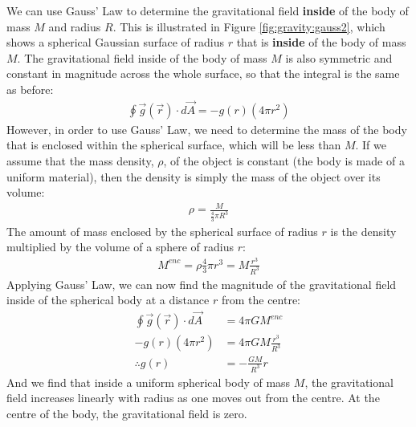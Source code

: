 We can use Gauss' Law to determine the gravitational field \textbf{inside} of the body of mass $M$ and radius $R$. This is illustrated in Figure \ref{fig:gravity:gauss2}, which shows a spherical Gaussian surface of radius $r$ that is \textbf{inside} of the body of mass $M$.
The gravitational field inside of the body of mass $M$ is also symmetric and constant in magnitude across the whole surface, so that the integral is the same as before:
\begin{align*}
\oint \vec g(\vec r) \cdot d\vec A=-g(r)(4\pi r^2)
\end{align*}
However, in order to use Gauss' Law, we need to determine the mass of the body that is enclosed within the spherical surface, which will be less than $M$. If we assume that the mass density, $\rho$, of the object is constant (the body is made of a uniform material), then the density is simply the mass of the object over its volume:
\begin{align*}
\rho = \frac{M}{\frac{4}{3}\pi R^3}
\end{align*}
The amount of mass enclosed by the spherical surface of radius $r$ is the density multiplied by the volume of a sphere of radius $r$:
\begin{align*}
M^{enc} = \rho \frac{4}{3}\pi r^3 = M\frac{r^3}{R^3}
\end{align*}
Applying Gauss' Law, we can now find the magnitude of the gravitational field inside of the spherical body at a distance $r$ from the centre:
\begin{align*}
\oint \vec g(\vec r) \cdot d\vec A &= 4\pi G M^{enc}\\
-g(r)(4\pi r^2) &= 4\pi G M\frac{r^3}{R^3}\\
\therefore g(r) &= - \frac{G M}{R^3}r
\end{align*}
And we find that inside a uniform  spherical body of mass $M$, the gravitational field increases linearly with radius as one moves out from the centre. At the centre of the body, the gravitational field is zero. 

